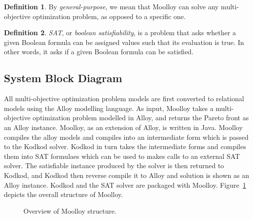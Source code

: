 \documentclass[11pt]{article}
\theoremstyle{definition}
\newtheorem{mydef}{Definition}
\begin{document}
\begin{mydef}
By \textit{general-purpose}, we mean that Moolloy can solve any
multi-objective optimization problem, as opposed to a specific one.
\end{mydef}

\begin{mydef}
\textit{SAT}, or \textit{boolean satisfiability}, is a problem that
asks whether a given Boolean formula can be assigned values such that
its evaluation is true. In other words, it asks if a given Boolean
formula can be satisfied.
\end{mydef}

\subsection{System Block Diagram}\label{sec:block_diag}
All multi-objective optimization problem models are first converted to relational models using the Alloy modelling language. As input, Moolloy takes a multi-objective optimization problem modelled in Alloy, and returns the Pareto front as an Alloy instance. Moolloy, as an extension of Alloy, is written in Java. Moolloy compiles the alloy models and compiles into an intermediate form which is passed to the Kodkod solver. Kodkod in turn takes the intermediate forms and compiles them into SAT formulaes which can be used to makes calls to an external SAT solver. The satisfiable instance produced by the solver is then returned to Kodkod, and Kodkod then reverse compile it to Alloy and solution is shown as an Alloy instance. Kodkod and the SAT solver are packaged with Moolloy.  Figure~\ref{fig:overview} depicts
the overall structure of Moolloy.


\begin{figure}[htbp]
  \centering
    \tikzset{>=latex}
  \caption{Overview of Moolloy structure.}\label{fig:overview}
\end{figure}
\end{document}

